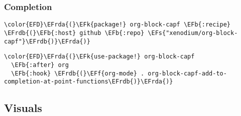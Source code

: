 \documentclass[12pt]{article}
\theoremstyle{plain}%
\theoremstyle{definition}
\theoremstyle{remark}
\newcommand{\EFs}[1]{\textcolor{EFs}{#1}} %
\newcommand{\EFk}[1]{\textcolor{EFk}{#1}} %
\newcommand{\EFb}[1]{\textcolor{EFb}{#1}} %
\newcommand{\EFf}[1]{\textcolor{EFf}{#1}} %
\newcommand{\EFrda}[1]{\textcolor{EFrda}{#1}} %
\newcommand{\EFrdb}[1]{\textcolor{EFrdb}{#1}} %
\begin{document}
\subsubsection{Completion}
\label{sec:org37584e7}
\begin{Code}
\begin{Verbatim}
\color{EFD}\EFrda{(}\EFk{package!} org-block-capf \EFb{:recipe} \EFrdb{(}\EFb{:host} github \EFb{:repo} \EFs{"xenodium/org-block-capf"}\EFrdb{)}\EFrda{)}
\end{Verbatim}
\end{Code}
\begin{Code}
\begin{Verbatim}
\color{EFD}\EFrda{(}\EFk{use-package!} org-block-capf
  \EFb{:after} org
  \EFb{:hook} \EFrdb{(}\EFf{org-mode} . org-block-capf-add-to-completion-at-point-functions\EFrdb{)}\EFrda{)}
\end{Verbatim}
\end{Code}
\subsection{Visuals}
\label{sec:orgb5733e2}
\end{document}
